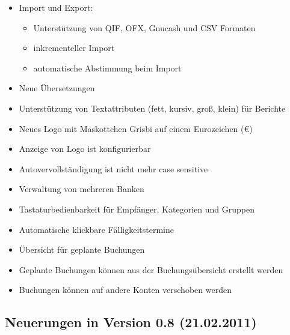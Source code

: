 \begin{itemize}
	\item Import und Export:%
		\begin{itemize}
		\item[\textopenbullet] Unterstützung von \gls{QIF}, \gls{OFX}, \gls{Gnucash} und \gls{CSV} Formaten%
		\item[\textopenbullet] inkrementeller Import%
		\item[\textopenbullet] automatische Abstimmung beim Import%
		\end{itemize}
	\item Neue Übersetzungen%
	\item Unterstützung von Textattributen (fett, kursiv, groß, klein) für Berichte%
	\item Neues Logo mit Maskottchen Grisbi auf einem Eurozeichen (€)%
	\item Anzeige von Logo ist konfigurierbar%
	\item Autovervollständigung ist nicht mehr case sensitive%
	\item Verwaltung von mehreren Banken%
	\item Tastaturbedienbarkeit für Empfänger, Kategorien und Gruppen%
	\item Automatische klickbare Fälligkeitstermine%
	\item Übersicht für geplante Buchungen%
	\item Geplante Buchungen können aus der Buchungsübersicht erstellt werden%
	\item Buchungen können auf andere Konten verschoben werden%
\end{itemize}


\subsection{Neuerungen in Version 0.8 \textnormal{(21.02.2011)}}%

